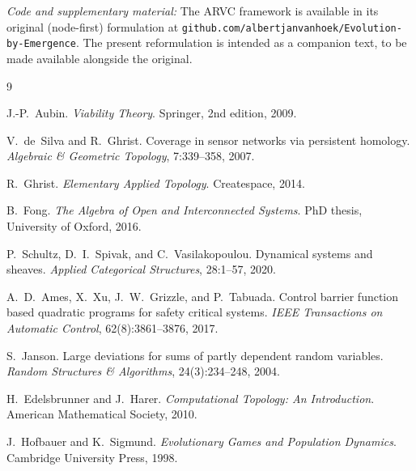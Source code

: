 \documentclass[11pt]{article}
\theoremstyle{definition}
\theoremstyle{remark}
\begin{document}
\bigskip

\noindent\emph{Code and supplementary material:} The ARVC framework is available in its original (node-first) formulation at \texttt{github.com/albertjanvanhoek/Evolution-by-Emergence}. The present reformulation is intended as a companion text, to be made available alongside the original.

\begin{thebibliography}{9}

J.-P.~Aubin.
\newblock \emph{Viability Theory}.
\newblock Springer, 2nd edition, 2009.

V.~de~Silva and R.~Ghrist.
\newblock Coverage in sensor networks via persistent homology.
\newblock \emph{Algebraic \& Geometric Topology}, 7:339--358, 2007.

R.~Ghrist.
\newblock \emph{Elementary Applied Topology}.
\newblock Createspace, 2014.

B.~Fong.
\newblock \emph{The Algebra of Open and Interconnected Systems}.
\newblock PhD thesis, University of Oxford, 2016.

P.~Schultz, D.~I.~Spivak, and C.~Vasilakopoulou.
\newblock Dynamical systems and sheaves.
\newblock \emph{Applied Categorical Structures}, 28:1--57, 2020.

A.~D.~Ames, X.~Xu, J.~W.~Grizzle, and P.~Tabuada.
\newblock Control barrier function based quadratic programs for safety critical systems.
\newblock \emph{IEEE Transactions on Automatic Control}, 62(8):3861--3876, 2017.

S.~Janson.
\newblock Large deviations for sums of partly dependent random variables.
\newblock \emph{Random Structures \& Algorithms}, 24(3):234--248, 2004.

H.~Edelsbrunner and J.~Harer.
\newblock \emph{Computational Topology: An Introduction}.
\newblock American Mathematical Society, 2010.

J.~Hofbauer and K.~Sigmund.
\newblock \emph{Evolutionary Games and Population Dynamics}.
\newblock Cambridge University Press, 1998.

\end{thebibliography}
\end{document}
